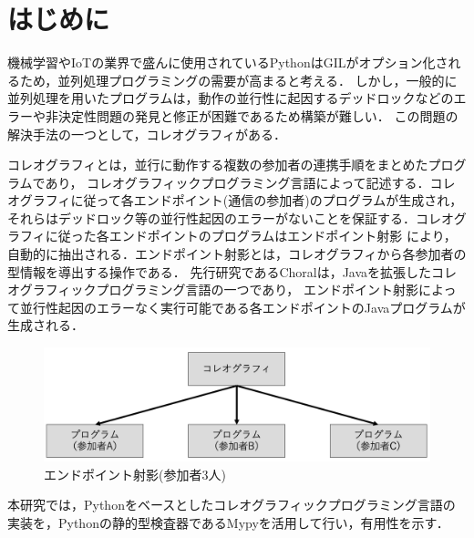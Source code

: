 \documentclass{resume}
\begin{document}
\maketitle

\section{はじめに}

機械学習やIoTの業界で盛んに使用されているPythonはGILがオプション化されるため，並列処理プログラミングの需要が高まると考える．
しかし，一般的に並列処理を用いたプログラムは，動作の並行性に起因するデッドロックなどのエラーや非決定性問題の発見と修正が困難であるため構築が難しい．
この問題の解決手法の一つとして，コレオグラフィがある．

コレオグラフィとは，並行に動作する複数の参加者の連携手順をまとめたプログラムであり，
コレオグラフィックプログラミング言語によって記述する．コレオグラフィに従って各エンドポイント(通信の参加者)のプログラムが生成され，
それらはデッドロック等の並行性起因のエラーがないことを保証する．コレオグラフィに従った各エンドポイントのプログラムはエンドポイント射影
\cite{endpoint}により，自動的に抽出される．エンドポイント射影とは，コレオグラフィから各参加者の型情報を導出する操作である．
先行研究であるChoral\cite{choral}は，Javaを拡張したコレオグラフィックプログラミング言語の一つであり，
エンドポイント射影によって並行性起因のエラーなく実行可能である各エンドポイントのJavaプログラムが生成される．
\vspace*{-7pt}
\begin{figure}[H]
  \centering
  \includegraphics[scale=0.3]{image/epp.png}
  \caption{エンドポイント射影(参加者3人)}
\end{figure}
\vspace*{-15pt}

本研究では，Pythonをベースとしたコレオグラフィックプログラミング言語の実装を，Pythonの静的型検査器であるMypyを活用して行い，有用性を示す．
\end{document}
